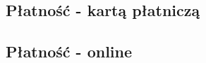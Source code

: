 \documentclass{sprawozdanie-agh}
\begin{document}
\begin{landscape}
	\newpage
	\subsection{Płatność - kartą płatniczą}
	\begin{figure}
		
	\end{figure}

	\newpage
	\subsection{Płatność - online}
	\begin{figure}
		
	\end{figure}
\end{landscape}
\end{document}
